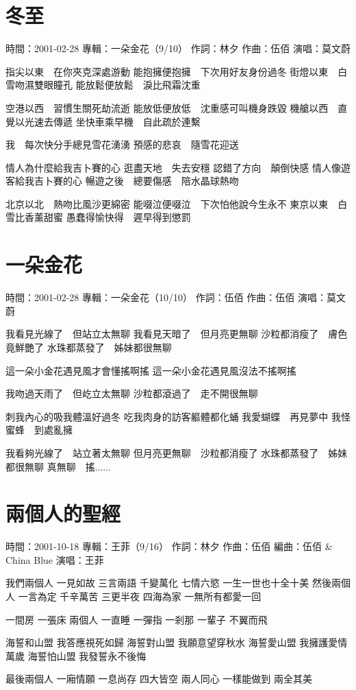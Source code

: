 \documentclass[UTF8,a4paper,oneside,twocolumn,12pt]{ctexbook}
\newcommand{\infopair}[2]{\textbullet #1：#2}
\newcommand{\zc}[1][伍佰]{\infopair{作詞}{#1}}
\newcommand{\zq}[1][伍佰]{\infopair{作曲}{#1}}
\newcommand{\bq}[1][伍佰]{\infopair{編曲}{#1}}
\newcommand{\zj}[1]{\infopair{專輯}{#1}}
\newcommand{\sj}[1]{\infopair{時間}{#1}}
\newenvironment{info}{\begin{flushleft}\kaishu
	}
	{\end{flushleft}\normalsize\yahei\par}
\newenvironment{lyric}{
	}
{}
\begin{document}
\section{冬至}
\begin{info}
	\sj{2001-02-28}
	\zj{一朵金花（9/10）}
	\zc[林夕]
	\zq
	\infopair{演唱}{莫文蔚}
\end{info}
\begin{lyric}
	指尖以東　在你夾克深處游動
	能抱擁便抱擁　下次用好友身份過冬
	街燈以東　白雪吻濕雙眼瞳孔
	能放鬆便放鬆　淚比飛霜沈重

	空港以西　習慣生關死劫流逝
	能放低便放低　沈重感可叫機身跌毀
	機艙以西　直覺以光速去傳遞
	坐快車乘早機　自此疏於連繫

	我　每次快分手總見雪花湧湧
	預感的悲哀　隨雪花迎送

	情人為什麼給我吉卜賽的心
	逛盡天地　失去安穩
	認錯了方向　顛倒快感
	情人像遊客給我吉卜賽的心
	暢遊之後　總要傷感　陪水晶球熱吻

	北京以北　熱吻比風沙更綿密
	能啜泣便啜泣　下次怕他說今生永不
	東京以東　白雪比香薰甜蜜
	愚蠢得愉快得　遲早得到懲罰
\end{lyric}

\section{一朵金花}
\begin{info}
	\sj{2001-02-28}
	\zj{一朵金花（10/10）}
	\zc
	\zq
	\infopair{演唱}{莫文蔚}
\end{info}
\begin{lyric}
	我看見光線了　但站立太無聊
	我看見天暗了　但月亮更無聊
	沙粒都消瘦了　膚色竟鮮艷了
	水珠都蒸發了　姊妹都很無聊

	這一朵小金花遇見風才會懂搖啊搖
	這一朵小金花遇見風沒法不搖啊搖

	我吻過天雨了　但屹立太無聊
	沙粒都滾過了　走不開很無聊

	刺我內心的吸我體溫好過冬
	吃我肉身的訪客軀體都化蛹
	我愛蝴蝶　再見夢中
	我怪蜜蜂　到處亂擁

	我看夠光線了　站立著太無聊
	但月亮更無聊　沙粒都消瘦了
	水珠都蒸發了　姊妹都很無聊
	真無聊　搖......
\end{lyric}

\section{兩個人的聖經}
\begin{info}
	\sj{2001-10-18}
	\zj{王菲（9/16）}
	\zc[林夕]
	\zq
	\bq[伍佰 \& China Blue]
	\infopair{演唱}{王菲}
\end{info}
\begin{lyric}
	我們兩個人 一見如故 三言兩語
	千變萬化 七情六慾 一生一世也十全十美
	然後兩個人 一言為定 千辛萬苦
	三更半夜 四海為家 一無所有都愛一回

	一間房 一張床 兩個人 一直睡
	一彈指 一剎那 一輩子 不翼而飛

	海誓和山盟 我答應視死如歸
	海誓對山盟 我願意望穿秋水
	海誓愛山盟 我擁護愛情萬歲
	海誓怕山盟 我發誓永不後悔

	最後兩個人 一廂情願 一息尚存
	四大皆空 兩人同心 一樣能做到 兩全其美
\end{lyric}
\end{document}
